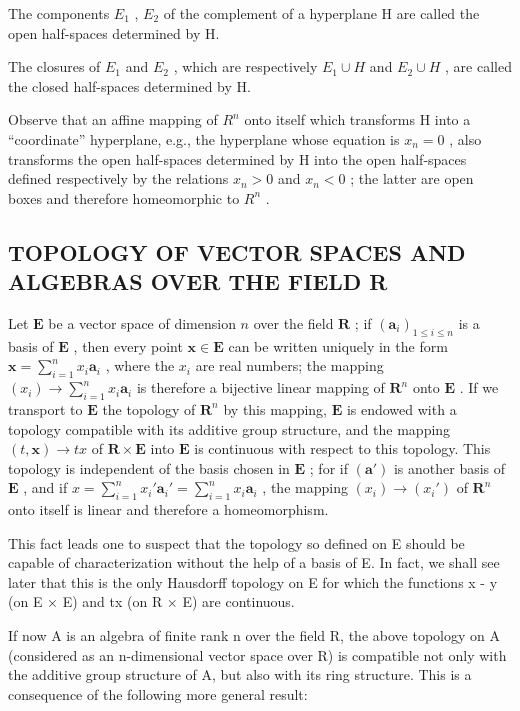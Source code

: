 The components \(E_{1}\) , \(E_{2}\) of the complement of a hyperplane H are called the open half-spaces determined by H.

The closures of \(E_{1}\) and \(E_{2}\) , which are respectively \(E_{1} \cup H\) and \(E_{2} \cup H\) , are called the closed half-spaces determined by H.

Observe that an affine mapping of \(R^{n}\) onto itself which transforms H into a ``coordinate'' hyperplane, e.g., the hyperplane whose equation is \(x_{n}=0\) , also transforms the open half-spaces determined by H into the open half-spaces defined respectively by the relations \(x_{n}>0\) and \(x_{n}<0\) ; the latter are open boxes and therefore homeomorphic to \(R^{n}\) .

\subsection{TOPOLOGY OF VECTOR SPACES AND ALGEBRAS OVER THE FIELD R}

Let \(\mathbf{E}\) be a vector space of dimension \(n\) over the field \(\mathbf{R}\) ; if \((\boldsymbol{a}_i)_{1 \leqslant i \leqslant n}\) is a basis of \(\mathbf{E}\) , then every point \(\boldsymbol{x} \in \mathbf{E}\) can be written uniquely in the form \(\boldsymbol{x} = \sum_{i=1}^{n} x_i \boldsymbol{a}_i\) , where the \(x_i\) are real numbers; the mapping \((x_i) \to \sum_{i=1}^{n} x_i \boldsymbol{a}_i\) is therefore a bijective linear mapping of \(\mathbf{R}^n\) onto \(\mathbf{E}\) . If we transport to \(\mathbf{E}\) the topology of \(\mathbf{R}^n\) by this mapping, \(\mathbf{E}\) is endowed with a topology compatible with its additive group structure, and the mapping \((t, \boldsymbol{x}) \to tx\) of \(\mathbf{R} \times \mathbf{E}\) into \(\mathbf{E}\) is continuous with respect to this topology. This topology is independent of the basis chosen in \(\mathbf{E}\) ; for if \((\boldsymbol{a}')\) is another basis of \(\mathbf{E}\) , and if \(x = \sum_{i=1}^{n} x_i' \boldsymbol{a}_i' = \sum_{i=1}^{n} x_i \boldsymbol{a}_i\) , the mapping \((x_i) \to (x_i')\) of \(\mathbf{R}^n\) onto itself is linear and therefore a homeomorphism.

This fact leads one to suspect that the topology so defined on E should be capable of characterization without the help of a basis of E. In fact, we shall see later that this is the only Hausdorff topology on E for which the functions x - y (on E × E) and tx (on R × E) are continuous.

If now A is an algebra of finite rank n over the field R, the above topology on A (considered as an n-dimensional vector space over R) is compatible not only with the additive group structure of A, but also with its ring structure. This is a consequence of the following more general result:

